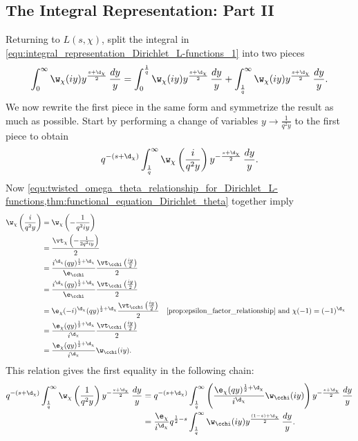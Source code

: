     \subsection*{The Integral Representation: Part II}
      Returning to $L(s,\chi)$, split the integral in \cref{equ:integral_representation_Dirichlet_L-functions_1} into two pieces
      \begin{equation}\label{equ:symmetric_integral_Dirichlet_L-functions_split}
        \int_{0}^{\infty}\w_{\chi}(iy)y^{\frac{s+\d_{\chi}}{2}}\,\frac{dy}{y} = \int_{0}^{\frac{1}{q}}\w_{\chi}(iy)y^{\frac{s+\d_{\chi}}{2}}\,\frac{dy}{y}+\int_{\frac{1}{q}}^{\infty}\w_{\chi}(iy)y^{\frac{s+\d_{\chi}}{2}}\,\frac{dy}{y}.
      \end{equation}
      We now rewrite the first piece in the same form and symmetrize the result as much as possible. Start by performing a change of variables $y \to \frac{1}{q^{2}y}$ to the first piece to obtain
      \[
        q^{-(s+\d_{\chi})}\int_{\frac{1}{q}}^{\infty}\w_{\chi}\left(\frac{i}{q^{2}y}\right)y^{-\frac{s+\d_{\chi}}{2}}\,\frac{dy}{y}.
      \]
      Now \cref{equ:twisted_omega_theta_relationship_for_Dirichlet_L-functions,thm:functional_equation_Dirichlet_theta} together imply
      \begin{align*}
        \w_{\chi}\left(\frac{i}{q^{2}y}\right) &= \w_{\chi}\left(-\frac{1}{q^{2}iy}\right) \\
        &= \frac{\vt_{\chi}\left(-\frac{1}{2q^{2}iy}\right)}{2} \\
        &= \frac{i^{\d_{\chi}}(qy)^{\frac{1}{2}+\d_{\chi}}}{\e_{\cchi}}\frac{\vt_{\cchi}\left(\frac{iy}{2}\right)}{2} \\
        &= \frac{i^{\d_{\chi}}(qy)^{\frac{1}{2}+\d_{\chi}}}{\e_{\cchi}}\frac{\vt_{\cchi}\left(\frac{iy}{2}\right)}{2} \\
        &= \e_{\chi}(-i)^{\d_{\chi}}(qy)^{\frac{1}{2}+\d_{\chi}}\frac{\vt_{\cchi}\left(\frac{iy}{2}\right)}{2} && \text{\cref{prop:epsilon_factor_relationship} and $\chi(-1) = (-1)^{\d_{\chi}}$} \\
        &= \frac{\e_{\chi}(qy)^{\frac{1}{2}+\d_{\chi}}}{i^{\d_{\chi}}}\frac{\vt_{\cchi}\left(\frac{iy}{2}\right)}{2} \\
        &= \frac{\e_{\chi}(qy)^{\frac{1}{2}+\d_{\chi}}}{i^{\d_{\chi}}}\w_{\cchi}(iy).
      \end{align*}
      This relation gives the first equality in the following chain:
      \begin{align*}
        q^{-(s+\d_{\chi})}\int_{\frac{1}{q}}^{\infty}\w_{\chi}\left(\frac{1}{q^{2}y}\right)y^{-\frac{s+\d_{\chi}}{2}}\,\frac{dy}{y} &= q^{-(s+\d_{\chi})}\int_{\frac{1}{q}}^{\infty}\left(\frac{\e_{\chi}(qy)^{\frac{1}{2}+\d_{\chi}}}{i^{\d_{\chi}}}\w_{\cchi}(iy)\right)y^{-\frac{s+\d_{\chi}}{2}}\,\frac{dy}{y} \\
        &= \frac{\e_{\chi}}{i^{\d_{\chi}}}q^{\frac{1}{2}-s}\int_{\frac{1}{q}}^{\infty}\w_{\cchi}(iy)y^{\frac{(1-s)+\d_{\chi}}{2}}\,\frac{dy}{y}.
      \end{align*}
